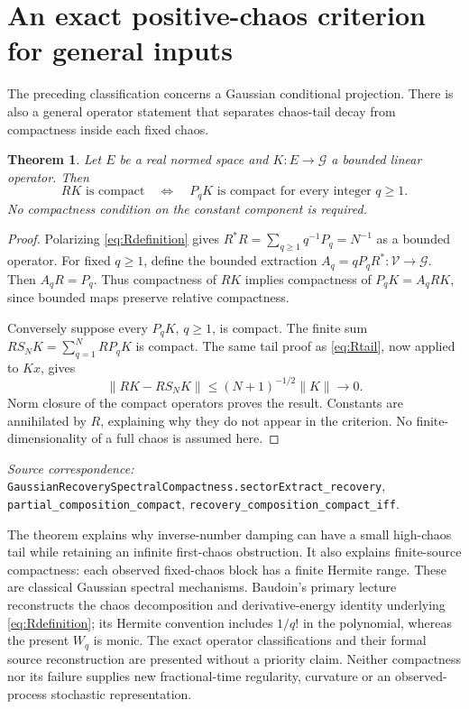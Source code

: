 \documentclass[11pt]{article}
\newtheorem{theorem}{Theorem}[section]
\newcommand{\code}[1]{{\small\nolinkurl{#1}}}
\begin{document}
\section{An exact positive-chaos criterion for general inputs}
The preceding classification concerns a Gaussian conditional projection.
There is also a general operator statement that separates chaos-tail
decay from compactness inside each fixed chaos.
\begin{theorem}\label{thm:sectorcompact}
Let $E$ be a real normed space and $K:E\to\mathcal G$ a bounded
linear operator. Then
\[
 RK\text{ is compact}\quad\Longleftrightarrow\quad
 P_qK\text{ is compact for every integer }q\geq1.
\]
No compactness condition on the constant component is required.
\end{theorem}
\begin{proof}
Polarizing \eqref{eq:Rdefinition} gives
$R^*R=\sum_{q\geq1}q^{-1}P_q=N^{-1}$ as a bounded operator.
For fixed $q\geq1$, define the bounded extraction
$A_q=qP_qR^*:\mathcal V\to\mathcal G$. Then
$A_qR=P_q$. Thus compactness of $RK$ implies compactness of
$P_qK=A_qRK$, since bounded maps preserve relative compactness.

Conversely suppose every $P_qK$, $q\geq1$, is compact. The finite
sum $RS_NK=\sum_{q=1}^NRP_qK$ is compact. The same tail proof as
\eqref{eq:Rtail}, now applied to $Kx$, gives
\[
 \|RK-RS_NK\|\leq(N+1)^{-1/2}\|K\|\longrightarrow0.
\]
Norm closure of the compact operators proves the result. Constants
are annihilated by $R$, explaining why they do not appear in the
criterion. No finite-dimensionality of a full chaos is assumed here.
\end{proof}
\par\smallskip\begingroup\small\raggedright
\textit{Source correspondence:} \code{GaussianRecoverySpectralCompactness.sectorExtract_recovery},
\code{partial_composition_compact}, \code{recovery_composition_compact_iff}.
\par\endgroup
The theorem explains why inverse-number damping can have a small
high-chaos tail while retaining an infinite first-chaos obstruction.
It also explains finite-source compactness: each observed fixed-chaos
block has a finite Hermite range. These are classical Gaussian spectral
mechanisms. Baudoin's primary lecture \cite{BaudoinRecovery} reconstructs
the chaos decomposition and derivative-energy identity underlying
\eqref{eq:Rdefinition}; its Hermite convention includes $1/q!$ in
the polynomial, whereas the present $W_q$ is monic. The exact operator
classifications and their formal source reconstruction are presented
without a priority claim. Neither compactness nor its failure supplies
new fractional-time regularity, curvature or an observed-process
stochastic representation.
\end{document}
